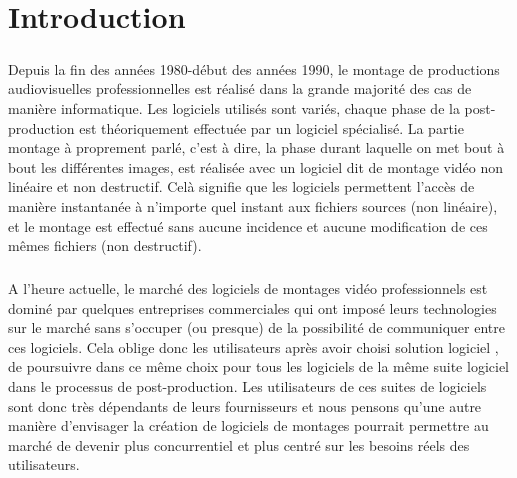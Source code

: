 








\setcounter{page}{1} \newpage \chapter*{Introduction}

\paragraph{}

Depuis la fin des années 1980-début des années 1990, le montage de
productions audiovisuelles professionnelles est réalisé dans la grande
majorité des cas de manière informatique. Les logiciels utilisés
sont variés, chaque phase de la post-production est théoriquement
effectuée par un logiciel spécialisé. La partie montage à proprement
parlé, c'est à dire, la phase durant laquelle on met bout à bout
les différentes images, est réalisée avec un logiciel dit de montage
vidéo non linéaire et non destructif. Celà signifie que les logiciels
permettent l'accès de manière instantanée à n'importe quel instant aux
fichiers sources (non linéaire), et le montage est effectué sans aucune
incidence et aucune modification de ces mêmes fichiers (non destructif).

\paragraph{}

A l'heure actuelle, le marché des logiciels de montages vidéo
professionnels est dominé par quelques entreprises commerciales qui ont
imposé leurs technologies sur le marché sans s'occuper (ou presque)
de la possibilité de communiquer entre ces logiciels.  Cela oblige donc
les utilisateurs après avoir choisi solution logiciel , de poursuivre
dans ce même choix pour tous les logiciels de la même suite logiciel
dans le processus de post-production. Les utilisateurs de ces suites
de logiciels sont donc très dépendants de leurs fournisseurs et nous
pensons qu'une autre manière d'envisager la création de logiciels de
montages pourrait permettre au marché de devenir plus concurrentiel et
plus centré sur les besoins réels des utilisateurs.

